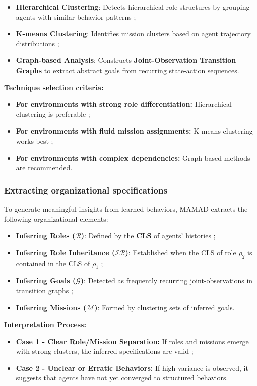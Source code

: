 \documentclass[journal]{IEEEtai}
\begin{document}
\begin{itemize}
    \item \textbf{Hierarchical Clustering}: Detects hierarchical role structures by grouping agents with similar behavior patterns ;
    \item \textbf{K-means Clustering}: Identifies mission clusters based on agent trajectory distributions ;
    \item \textbf{Graph-based Analysis}: Constructs \textbf{Joint-Observation Transition Graphs} to extract abstract goals from recurring state-action sequences.
\end{itemize}

\noindent \textbf{Technique selection criteria:}
\begin{itemize}
    \item \textbf{For environments with strong role differentiation:} Hierarchical clustering is preferable ;
    \item \textbf{For environments with fluid mission assignments:} K-means clustering works best ;
    \item \textbf{For environments with complex dependencies:} Graph-based methods are recommended.
\end{itemize}

\subsubsection{Extracting organizational specifications}
To generate meaningful insights from learned behaviors, MAMAD extracts the following organizational elements:

\begin{itemize}
    \item \textbf{Inferring Roles ($\mathcal{R}$)}: Defined by the \textbf{CLS} of agents' histories ;
    \item \textbf{Inferring Role Inheritance ($\mathcal{IR}$)}: Established when the CLS of role $\rho_2$ is contained in the CLS of $\rho_1$ ;
    \item \textbf{Inferring Goals ($\mathcal{G}$)}: Detected as frequently recurring joint-observations in transition graphs ;
    \item \textbf{Inferring Missions ($\mathcal{M}$)}: Formed by clustering sets of inferred goals.
\end{itemize}

\noindent \textbf{Interpretation Process:}
\begin{itemize}
    \item \textbf{Case 1 - Clear Role/Mission Separation:} If roles and missions emerge with strong clusters, the inferred specifications are valid ;
    \item \textbf{Case 2 - Unclear or Erratic Behaviors:} If high variance is observed, it suggests that agents have not yet converged to structured behaviors.
\end{itemize}
\end{document}
